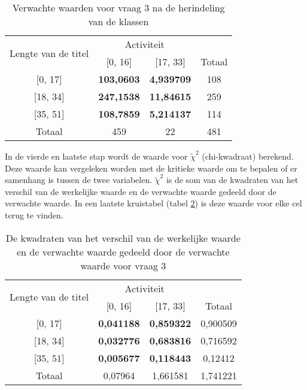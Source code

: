 {\begin{table}[]
	\centering
	\begin{tabular}{|c|c|c|c|}
		\hline
		\multirow{2}{*}{Lengte van de titel} & \multicolumn{2}{c|}{Activiteit}       & \multicolumn{1}{l|}{} \\ \cline{2-4} 
		& {[}0, 16{]}       & {[}17, 33{]}      & Totaal                \\ \hline
		{[}0, 17{]}                          & \textbf{103,0603} & \textbf{4,939709} & 108                   \\ \hline
		{[}18, 34{]}                         & \textbf{247,1538} & \textbf{11,84615} & 259                   \\ \hline
		{[}35, 51{]}                         & \textbf{108,7859} & \textbf{5,214137} & 114                   \\ \hline
		Totaal                               & 459               & 22                & 481                   \\ \hline
	\end{tabular}
	\caption{Verwachte waarden voor vraag 3 na de herindeling van de klassen}
	\label{table:tablecorrectV}
\end{table}

In de vierde en laatste stap wordt de waarde voor $\tilde\chi^2$ (chi-kwadraat) berekend. Deze waarde kan vergeleken worden met de kritieke waarde om te bepalen of er samenhang is tussen de twee variabelen. $\tilde\chi^2$ is de som van de kwadraten van het verschil van de werkelijke waarde en de verwachte waarde gedeeld door de verwachte waarde. In een laatste kruistabel (tabel \ref{table:tablecorrectvalues}) is deze waarde voor elke cel terug te vinden.

\begin{table}[]
	\centering
	\begin{tabular}{|c|c|c|c|}
		\hline
		\multirow{2}{*}{Lengte van de titel} & \multicolumn{2}{c|}{Activiteit}       & \multicolumn{1}{l|}{} \\ \cline{2-4} 
		& {[}0, 16{]}       & {[}17, 33{]}      & Totaal                \\ \hline
		{[}0, 17{]}                          & \textbf{0,041188} & \textbf{0,859322} & 0,900509              \\ \hline
		{[}18, 34{]}                         & \textbf{0,032776} & \textbf{0,683816} & 0,716592              \\ \hline
		{[}35, 51{]}                         & \textbf{0,005677} & \textbf{0,118443} & 0,12412               \\ \hline
		Totaal                               & 0,07964           & 1,661581          & 1,741221              \\ \hline
	\end{tabular}
	\caption{De kwadraten van het verschil van de werkelijke waarde en de verwachte waarde gedeeld door de verwachte waarde voor vraag 3}
	\label{table:tablecorrectvalues}
\end{table}

}
